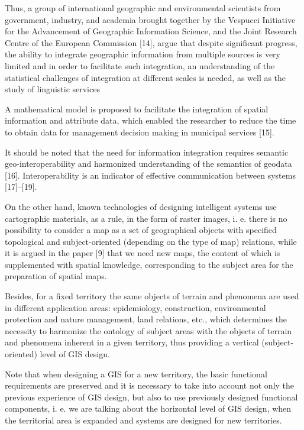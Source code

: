 \documentclass[a4paper]{article}
\begin{document}
\begin{multicols}{2}
{Thus, a group of international geographic and environmental scientists from government, industry, and
academia brought together by the Vespucci Initiative for
the Advancement of Geographic Information Science,
and the Joint Research Centre of the European Commission [14], argue that despite significant progress, the
ability to integrate geographic information from multiple
sources is very limited and in order to facilitate such
integration, an understanding of the statistical challenges
of integration at different scales is needed, as well as the
study of linguistic services\par
A mathematical model is proposed to facilitate the
integration of spatial information and attribute data,
which enabled the researcher to reduce the time to obtain data for management decision making in municipal
services [15].\par
It should be noted that the need for information integration requires semantic geo-interoperability and harmonized understanding of the semantics of geodata [16].
Interoperability is an indicator of effective communication between systems [17]–[19].\par
On the other hand, known technologies of designing
intelligent systems use cartographic materials, as a rule,
in the form of raster images, i. e. there is no possibility
to consider a map as a set of geographical objects with
specified topological and subject-oriented (depending on
the type of map) relations, while it is argued in the
paper [9] that we need new maps, the content of which
is supplemented with spatial knowledge, corresponding
to the subject area for the preparation of spatial maps.\par
Besides, for a fixed territory the same objects of
terrain and phenomena are used in different application
areas: epidemiology, construction, environmental protection and nature management, land relations, etc., which
determines the necessity to harmonize the ontology of
subject areas with the objects of terrain and phenomena
inherent in a given territory, thus providing a vertical
(subject-oriented) level of GIS design.\par
Note that when designing a GIS for a new territory,
the basic functional requirements are preserved and it
is necessary to take into account not only the previous
experience of GIS design, but also to use previously
designed functional components, i. e. we are talking about the horizontal level of GIS design, when the
territorial area is expanded and systems are designed for
new territories.\par

}
\end{multicols}
\end{document}
